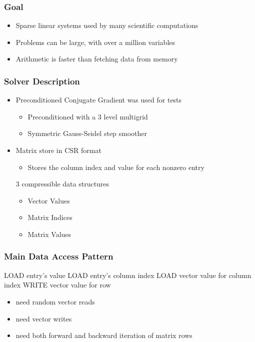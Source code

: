 \documentclass{beamer}
\title{}
\author{\textbf{Neil Lindquist}\\
All-College Thesis Defense}
\date{April 16th, 2019}
\begin{document}
\begin{frame}
	\titlepage
\end{frame}

\begin{frame}
	\frametitle{Goal}
	\begin{itemize}
		\item Sparse linear systems used by many scientific computations
		\item Problems can be large, with over a million variables
		\item Arithmetic is faster than fetching data from memory
	\end{itemize}
\end{frame}

\begin{frame}[fragile]
	\frametitle{Solver Description}
	\begin{itemize}
		\item Preconditioned Conjugate Gradient was used for tests
		\begin{itemize}
			\item Preconditioned with a 3 level multigrid
			\item Symmetric Gauss-Seidel step smoother
		\end{itemize}
		\item Matrix store in CSR format
		\begin{itemize}
			\item Stores the column index and value for each nonzero entry
		\end{itemize}
		3 compressible data structures
		\begin{itemize}
			\item Vector Values
			\item Matrix Indices
			\item Matrix Values
		\end{itemize}
	\end{itemize}
\end{frame}


\begin{frame}
	\frametitle{Main Data Access Pattern}
	\begin{algorithmic}
				\STATE LOAD entry's value
				\STATE LOAD entry's column index
				\STATE LOAD vector value for column index
			\ENDFOR
			\STATE WRITE vector value for row
		\ENDFOR
	\end{algorithmic}
	
	\begin{itemize}
		\item need random vector reads
		\item need vector writes
		\item need both forward and backward iteration of matrix rows
	\end{itemize}
\end{frame}
\end{document}
